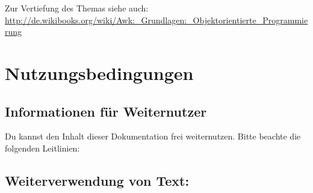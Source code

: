 \documentclass[10pt,a4paper]{article}
\begin{document}
\bigskip 
Zur Vertiefung des Themas siehe auch: \url{http://de.wikibooks.org/wiki/Awk:_Grundlagen:_Objektorientierte_Programmierung}




\section{Nutzungsbedingungen}

\subsection{Informationen für Weiternutzer}

Du kannst den Inhalt dieser Dokumentation frei weiternutzen. Bitte beachte die
folgenden Leitlinien:

\subsection{Weiterverwendung von Text:}
\end{document}
